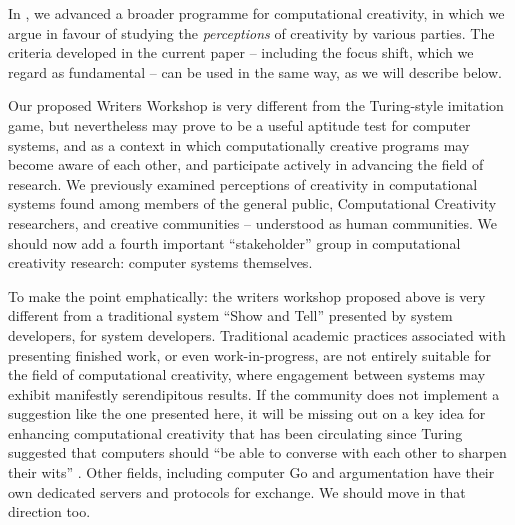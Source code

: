 In \cite{stakeholder-groups-bookchapter}, we advanced a broader
programme for computational creativity, in which we argue in favour of
studying the \emph{perceptions} of creativity by various parties.  The
criteria developed in the current paper -- including the focus shift,
which we regard as fundamental -- can be used in the same way, as we
will describe below.


Our proposed Writers Workshop is very different from the Turing-style
imitation game, but nevertheless may prove to be a useful aptitude
test for computer systems, and as a context in which computationally
creative programs may become aware of each other, and participate
actively in advancing the field of research.  We previously examined
perceptions of creativity in computational systems found among members
of the general public, Computational Creativity researchers, and
creative communities -- understood as human communities.  We should
now add a fourth important ``stakeholder'' group in computational
creativity research: computer systems themselves.

To make the point emphatically: the writers workshop proposed above is
very different from a traditional system ``Show and Tell'' presented
by system developers, for system developers.  Traditional academic
practices associated with presenting finished work, or even
work-in-progress, are not entirely suitable for the field of
computational creativity, where engagement between systems may exhibit
manifestly serendipitous results.  If the community does not implement
a suggestion like the one presented here, it will be missing out on a
key idea for enhancing computational creativity that has been
circulating since Turing suggested that computers should ``be able to
converse with each other to sharpen their wits''
\cite{turing-intelligent}.  Other fields, including computer Go
\cite{bouzy2001computer} and argumentation \cite{yuan2008towards} have
their own dedicated servers and protocols for exchange.  We should
move in that direction too.

